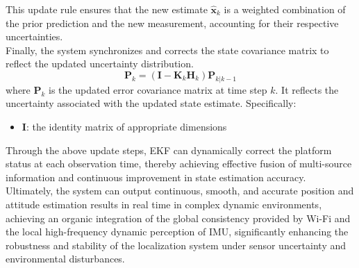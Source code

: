\documentclass[12pt,a4paper]{article}
\numberwithin{equation}{section}
\begin{document}
This update rule ensures that the new estimate $\hat{\mathbf{x}}_k$ is a weighted combination of the prior prediction and the new measurement, accounting for their respective uncertainties.\\
Finally, the system synchronizes and corrects the state covariance matrix to reflect the updated uncertainty distribution.
\begin{equation}
\mathbf{P}_k = (\mathbf{I} - \mathbf{K}_k \mathbf{H}_k) \mathbf{P}_{k|k-1}
\label{eq:cov_update}
\end{equation}
\noindent
where $\mathbf{P}_k$ is the updated error covariance matrix at time step $k$. It reflects the uncertainty associated with the updated state estimate. Specifically:
\begin{itemize}
  \item $\mathbf{I}$: the identity matrix of appropriate dimensions
\end{itemize}
Through the above update steps, EKF can dynamically correct the platform status at each observation time, thereby achieving effective fusion of multi-source information and continuous improvement in state estimation accuracy.\\
Ultimately, the system can output continuous, smooth, and accurate position and attitude estimation results in real time in complex dynamic environments, achieving an organic integration of the global consistency provided by Wi-Fi and the local high-frequency dynamic perception of IMU, significantly enhancing the robustness and stability of the localization system under sensor uncertainty and environmental disturbances.
\end{document}
